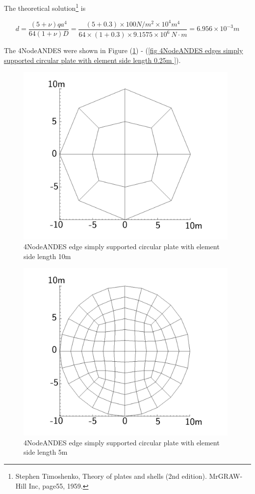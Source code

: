 \documentclass[fleqn,11pt]{article}
\begin{document}
The theoretical solution\footnote{Stephen Timoshenko, Theory of plates and shells (2nd edition). MrGRAW-Hill Inc, page55, 1959.} is 

\begin{equation}
  d= \frac{(5+\nu)  q a^4}{64(1+\nu) D}=\frac{(5+0.3)\times 100 N/m^2 \times 10^4 m^4}{64\times(1+0.3) \times 9.1575 \times 10^6 \ N\cdot m}=6.956\times 10^{-3} m
\end{equation}


The 4NodeANDES were shown in Figure (\ref{fig 4NodeANDES edges simply supported circular plate with element side length 10m }) - (\ref{fig 4NodeANDES edges simply supported circular plate with element side length 0.25m }). 



\begin{figure}[H]
  \centering
  \includegraphics[width=11cm]{../Figure-files/circular_plate1.pdf}
  \caption{4NodeANDES edge simply supported circular plate with element side length 10m }
  \label{fig 4NodeANDES edges simply supported circular plate with element side length 10m }
\end{figure}

\newpage

\begin{figure}[H]
  \centering
  \includegraphics[width=11cm]{../Figure-files/circular_plate2.pdf}
  \caption{4NodeANDES edge simply supported circular plate with element side length 5m }
  \label{fig 4NodeANDES edges simply supported circular plate with element side length 5m }
\end{figure}
\end{document}
